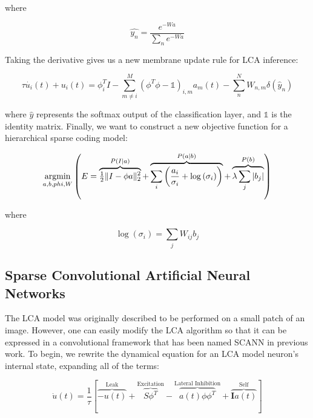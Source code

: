 \documentclass[smallextended]{svjour3}       %
\newcommand{\argmin}{\operatornamewithlimits{argmin}}
\begin{document}
\noindent where

\begin{displaymath}
    \hat{y_{n}} = \frac{e^{-Wa}}{\sum_{n}e^{-Wa}}
\end{displaymath}

\noindent Taking the derivative gives us a new membrane update rule for LCA inference:

\begin{equation}
    \tau\dot{u_{i}}(t) + u_{i}(t) =
        \phi_{i}^{T}I -
        \sum_{m \neq i}^{M}\left(\phi^{T}\phi-\mathbb{1}\right)_{i,m}a_{m}(t) -
        \sum_{n}^{N} W_{n,m}\delta(\hat{y}_{n})
\end{equation}

\noindent where $\hat{y}$ represents the softmax output of the classification layer, and $\mathbb{1}$ is the identity matrix. Finally, we want to construct a new objective function for a hierarchical sparse coding model:

\begin{displaymath} \label{semi_supervised_energy}
    \argmin\limits_{a, b, phi, W}
        \left( E =
        \overbrace{ \tfrac{1}{2} \| I - \phi a \|_{2}^{2} }^\text{$P(I|a)$} +
        \overbrace{ \sum\limits_{i}\left(\frac{a_{i}}{\sigma_{i}} +
        \log \left( \sigma_{i} \right)\right) }^\text{$P(a|b)$} +
        \overbrace{ \lambda \sum\limits_{j} |b_{j}| }^\text{$P(b)$}
        \right)
\end{displaymath}

\noindent where

\begin{displaymath}
\log\left(\sigma_{i}\right) = \sum_{j} W_{ij} b_{j}
\end{displaymath}

\subsection{Sparse Convolutional Artificial Neural Networks}\label{scann}
\noindent The LCA model was originally described to be performed on a small patch of an image. However, one can easily modify the LCA algorithm so that it can be expressed in a convolutional framework that has been named SCANN in previous work. To begin, we rewrite the dynamical equation for an LCA model neuron's internal state, expanding all of the terms:

\begin{displaymath}
    \dot{u}(t) =
        \frac{1}{\tau} \left[ \overbrace{ -u(t) }^\text{Leak} +
        \overbrace{ S \phi^T }^\text{Excitation} -
        \overbrace{ a(t) \phi \phi^T }^\text{Lateral Inhibition} +
        \overbrace{ \mathbf{I} a(t)}^\text{Self} \right]
\end{displaymath}
\end{document}
